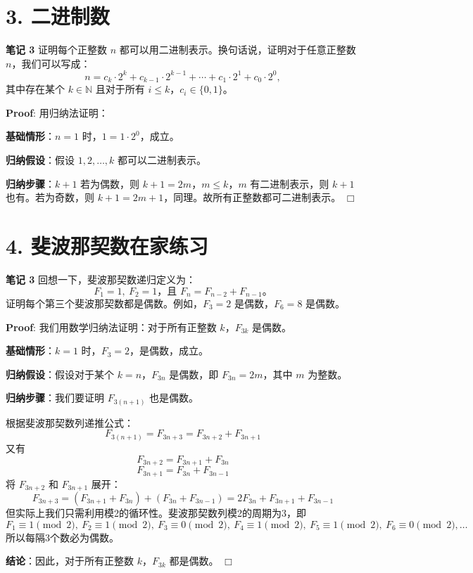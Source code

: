 \documentclass[11pt]{article}
\def\endproofmark{$\Box$}
\newenvironment{proof}{\par{\bf Proof}:}{\endproofmark\smallskip}
\begin{document}
\section*{3. 二进制数}
\textbf{笔记 3} 证明每个正整数 $n$ 都可以用二进制表示。换句话说，证明对于任意正整数 $n$，我们可以写成：
\[
n = c_k \cdot 2^k + c_{k-1} \cdot 2^{k-1} + \cdots + c_1 \cdot 2^1 + c_0 \cdot 2^0,
\]
其中存在某个 $k \in \mathbb{N}$ 且对于所有 $i \leq k$，$c_i \in \{0, 1\}$。

\begin{proof}
用归纳法证明：

\textbf{基础情形}：$n=1$ 时，$1=1\cdot 2^0$，成立。

\textbf{归纳假设}：假设 $1,2,\ldots,k$ 都可以二进制表示。

\textbf{归纳步骤}：$k+1$ 若为偶数，则 $k+1=2m$，$m\leq k$，$m$ 有二进制表示，则 $k+1$ 也有。若为奇数，则 $k+1=2m+1$，同理。故所有正整数都可二进制表示。
\end{proof}

\section*{4. 斐波那契数在家练习}
\textbf{笔记 3} 回想一下，斐波那契数递归定义为：
\[
F_1 = 1,\ F_2 = 1 \text{，且 } F_n = F_{n-2} + F_{n-1}。
\]
证明每个第三个斐波那契数都是偶数。例如，$F_3 = 2$ 是偶数，$F_6 = 8$ 是偶数。

\begin{proof}
我们用数学归纳法证明：对于所有正整数 $k$，$F_{3k}$ 是偶数。

\textbf{基础情形}：$k=1$ 时，$F_3=2$，是偶数，成立。

\textbf{归纳假设}：假设对于某个 $k=n$，$F_{3n}$ 是偶数，即 $F_{3n}=2m$，其中 $m$ 为整数。

\textbf{归纳步骤}：我们要证明 $F_{3(n+1)}$ 也是偶数。

根据斐波那契数列递推公式：
\[
F_{3(n+1)} = F_{3n+3} = F_{3n+2} + F_{3n+1}
\]
又有
\[
F_{3n+2} = F_{3n+1} + F_{3n}
\]
\[
F_{3n+1} = F_{3n} + F_{3n-1}
\]
将 $F_{3n+2}$ 和 $F_{3n+1}$ 展开：
\[
F_{3n+3} = (F_{3n+1} + F_{3n}) + (F_{3n} + F_{3n-1}) = 2F_{3n} + F_{3n+1} + F_{3n-1}
\]
但实际上我们只需利用模2的循环性。斐波那契数列模2的周期为3，即
\[
F_1 \equiv 1 \pmod{2},\ F_2 \equiv 1 \pmod{2},\ F_3 \equiv 0 \pmod{2},\ F_4 \equiv 1 \pmod{2},\ F_5 \equiv 1 \pmod{2},\ F_6 \equiv 0 \pmod{2},\ldots
\]
所以每隔3个数必为偶数。

\textbf{结论}：因此，对于所有正整数 $k$，$F_{3k}$ 都是偶数。
\end{proof}
\end{document}
